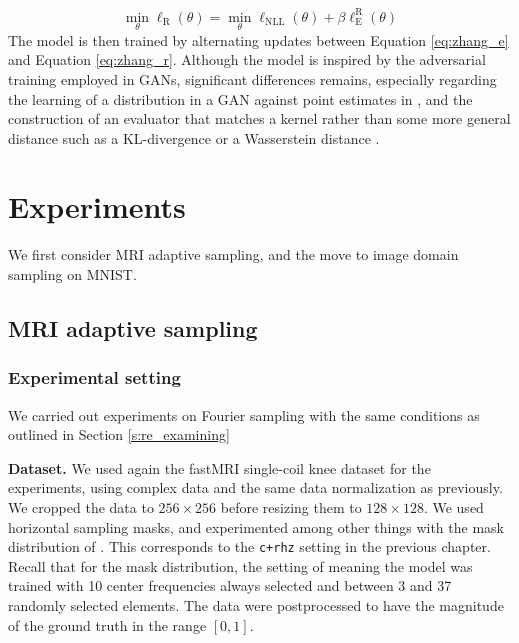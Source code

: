 \begin{equation}
\min_\theta \ell_{\text{R}}(\theta) = \min_\theta \ell_{\text{NLL}}(\theta) + \beta \ell_{\text{E}}^{\text{R}}(\theta)\label{eq:zhang_r}
\end{equation}
The model is then trained by alternating updates between Equation \ref{eq:zhang_e} and Equation \ref{eq:zhang_r}. Although the model is inspired by the adversarial training employed in GANs, significant differences remains, especially regarding the learning of a distribution in a GAN against point estimates in \citet{zhang2019reducing}, and the construction of an evaluator that matches a kernel rather than some more general distance such as a KL-divergence \citep{goodfellow2014generative} or a Wasserstein distance \citep{arjovsky2017wasserstein}.

\section{Experiments}\label{sec:gan_experiment}
We first consider MRI adaptive sampling, and the move to image domain sampling on MNIST. 
\subsection{MRI adaptive sampling}\label{ss:mri_gan}

\subsubsection{Experimental setting}
We carried out experiments on Fourier sampling with the same conditions as outlined in Section \ref{s:re_examining} 

\textbf{Dataset.} We used again the fastMRI \citep{zbontarFastMRIOpenDataset2019} single-coil knee dataset for the experiments, using complex data and the same data normalization as previously. We cropped the data to $256\times 256$ before resizing them to $128\times 128$. We used horizontal sampling masks, and experimented among other things with the mask distribution of \citet{zhang2019reducing}. This corresponds to the \texttt{c+rhz} setting in the previous chapter. 
Recall that for the mask distribution, the setting of \citet{zhang2019reducing} meaning the model was trained with 10 center frequencies always selected and between 3 and 37 randomly selected elements. The data were postprocessed to have the magnitude of the ground truth in the range $[0,1]$.



